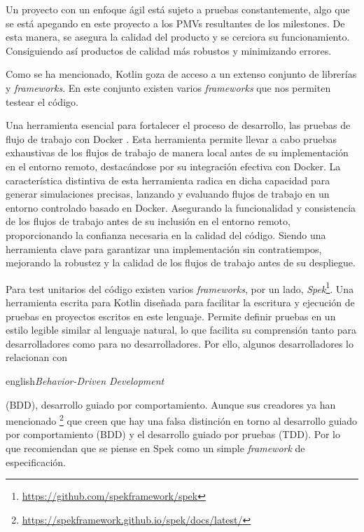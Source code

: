 Un proyecto con un enfoque ágil está sujeto a pruebas constantemente, algo que se está apegando en este 
proyecto a los PMVs resultantes de los milestones. De esta manera, se asegura la 
calidad del producto y se cerciora su funcionamiento. Consiguiendo así productos de 
calidad más robustos y minimizando errores.

Como se ha mencionado, Kotlin goza de acceso a un extenso conjunto de librerías y \textit{frameworks}. 
En este conjunto existen varios \textit{frameworks} que nos permiten testear el código.

Una herramienta esencial para fortalecer el proceso de desarrollo, las pruebas de flujo de trabajo con Docker 
\cite{GI_act}. Esta herramienta permite llevar a cabo pruebas exhaustivas de los flujos de trabajo de manera 
local antes de su implementación en el entorno remoto, destacándose por su integración efectiva con Docker. La 
característica distintiva de esta herramienta radica en dicha capacidad para generar simulaciones precisas, 
lanzando y evaluando flujos de trabajo en un entorno controlado basado en Docker. Asegurando la funcionalidad y 
consistencia de los flujos de trabajo antes de su inclusión en el entorno remoto, proporcionando la confianza 
necesaria en la calidad del código. Siendo una herramienta clave para garantizar una implementación sin 
contratiempos, mejorando la robustez y la calidad de los flujos de trabajo antes de su despliegue.

Para test unitarios del código existen varios \textit{frameworks}, por un lado,  
\textit{Spek}\footnote{\url{https://github.com/spekframework/spek}}. Una herramienta escrita para 
Kotlin diseñada para facilitar la escritura y ejecución de pruebas en proyectos escritos en este 
lenguaje. Permite definir pruebas en un estilo legible similar al lenguaje natural, lo que facilita 
su comprensión tanto para desarrolladores como para no desarrolladores. Por ello, algunos 
desarrolladores lo relacionan con \begin{otherlanguage}
{english}\textit{Behavior-Driven Development}\end{otherlanguage} (BDD), desarrollo guiado por 
comportamiento. Aunque sus creadores ya han mencionado 
\footnote{\url{https://spekframework.github.io/spek/docs/latest/}} que creen que hay una falsa 
distinción en torno al desarrollo guiado por comportamiento (BDD) y el desarrollo guiado por pruebas 
(TDD). Por lo que recomiendan que se piense en Spek como un simple \textit{framework} de 
especificación.


